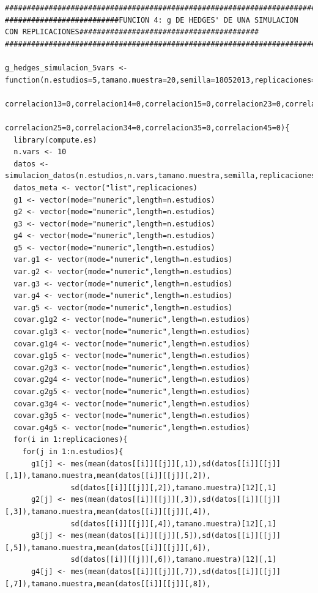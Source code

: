 \documentclass[a4paper,openright,12pt]{report}
\begin{document}
{\begin{verbatim}
##############################################################################################################################
##########################FUNCION 4: g DE HEDGES' DE UNA SIMULACION CON REPLICACIONES#########################################
##############################################################################################################################

g_hedges_simulacion_5vars <- function(n.estudios=5,tamano.muestra=20,semilla=18052013,replicaciones=5,correlacion12=0,
                                      correlacion13=0,correlacion14=0,correlacion15=0,correlacion23=0,correlacion24=0,
                                      correlacion25=0,correlacion34=0,correlacion35=0,correlacion45=0){
  library(compute.es)
  n.vars <- 10
  datos <- simulacion_datos(n.estudios,n.vars,tamano.muestra,semilla,replicaciones)
  datos_meta <- vector("list",replicaciones)
  g1 <- vector(mode="numeric",length=n.estudios)
  g2 <- vector(mode="numeric",length=n.estudios)
  g3 <- vector(mode="numeric",length=n.estudios)
  g4 <- vector(mode="numeric",length=n.estudios)
  g5 <- vector(mode="numeric",length=n.estudios)
  var.g1 <- vector(mode="numeric",length=n.estudios)
  var.g2 <- vector(mode="numeric",length=n.estudios)
  var.g3 <- vector(mode="numeric",length=n.estudios)
  var.g4 <- vector(mode="numeric",length=n.estudios)
  var.g5 <- vector(mode="numeric",length=n.estudios)
  covar.g1g2 <- vector(mode="numeric",length=n.estudios) 
  covar.g1g3 <- vector(mode="numeric",length=n.estudios)
  covar.g1g4 <- vector(mode="numeric",length=n.estudios) 
  covar.g1g5 <- vector(mode="numeric",length=n.estudios) 
  covar.g2g3 <- vector(mode="numeric",length=n.estudios)
  covar.g2g4 <- vector(mode="numeric",length=n.estudios) 
  covar.g2g5 <- vector(mode="numeric",length=n.estudios) 
  covar.g3g4 <- vector(mode="numeric",length=n.estudios) 
  covar.g3g5 <- vector(mode="numeric",length=n.estudios) 
  covar.g4g5 <- vector(mode="numeric",length=n.estudios) 
  for(i in 1:replicaciones){
    for(j in 1:n.estudios){
      g1[j] <- mes(mean(datos[[i]][[j]][,1]),sd(datos[[i]][[j]][,1]),tamano.muestra,mean(datos[[i]][[j]][,2]),
               sd(datos[[i]][[j]][,2]),tamano.muestra)[12][,1]
      g2[j] <- mes(mean(datos[[i]][[j]][,3]),sd(datos[[i]][[j]][,3]),tamano.muestra,mean(datos[[i]][[j]][,4]),
               sd(datos[[i]][[j]][,4]),tamano.muestra)[12][,1]
      g3[j] <- mes(mean(datos[[i]][[j]][,5]),sd(datos[[i]][[j]][,5]),tamano.muestra,mean(datos[[i]][[j]][,6]),
               sd(datos[[i]][[j]][,6]),tamano.muestra)[12][,1]
      g4[j] <- mes(mean(datos[[i]][[j]][,7]),sd(datos[[i]][[j]][,7]),tamano.muestra,mean(datos[[i]][[j]][,8]),

\end{verbatim}}
\end{document}
